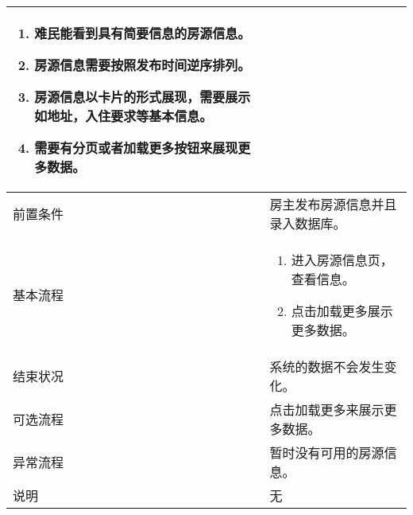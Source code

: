 \begin{table}[htbp]
\begin{tabular}{|l|l|l|l|}
{\begin{minipage}[t]{0.8\linewidth}
                \begin{enumerate}[nosep]
                    \item 难民能看到具有简要信息的房源信息。
                    \item 房源信息需要按照发布时间逆序排列。
                    \item 房源信息以卡片的形式展现，需要展示如地址，入住要求等基本信息。
                    \item 需要有分页或者加载更多按钮来展现更多数据。
                          \vspace{0.5em}
                \end{enumerate}
            \end{minipage}     }                                                                                                                                             \\
        \hline
        前置条件                          & \multicolumn{3}{l|}{  房主发布房源信息并且录入数据库。  }                                                                                \\
        \hline
        基本流程                          & \multicolumn{3}{l|}{
        \begin{minipage}[t]{0.8\textwidth}
                \begin{enumerate}[nosep]
                    \item 进入房源信息页，查看信息。
                    \item 点击加载更多展示更多数据。
                          \vspace{0.5em}
                \end{enumerate}
            \end{minipage}     }                                                                                                                                             \\
        \hline
        结束状况                          & \multicolumn{3}{l|}{系统的数据不会发生变化。    }                                                                                        \\
        \hline
        可选流程                          & \multicolumn{3}{l|}{点击加载更多来展示更多数据。  }                                                                                      \\
        \hline
        异常流程                          & \multicolumn{3}{l|}{暂时没有可用的房源信息。    }                                                                                        \\
        \hline
        说明                              & \multicolumn{3}{l|}{无     }                                                                                                             \\
        \hline
    \end{tabular}
\end{table}

